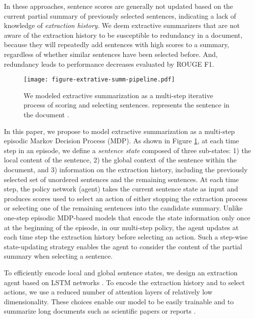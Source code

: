 \documentclass[11pt]{article}
\begin{document}
In these approaches, sentence scores are generally not updated based on the current partial summary of previously selected sentences, indicating a lack of knowledge of \textit{extraction history}. We deem extractive summarizers that are not aware of the extraction history to be susceptible to redundancy in a document, because they will repeatedly add sentences with high scores to a summary, regardless of whether similar sentences have been selected before. And, redundancy leads to performance decreases evaluated by ROUGE F1.

\begin{figure}
\centering
  \texttt{[image: figure-extrative-summ-pipeline.pdf]}
  \caption{We modeled extractive summarization as a multi-step iterative process of scoring and selecting sentences.  represents the  sentence in the document .}
  \label{fig:extractive_summ_pipeline}
\end{figure}


In this paper, we propose to model extractive summarization as a multi-step episodic Markov Decision Process (MDP). As shown in Figure \ref{fig:extractive_summ_pipeline}, at each time step in an episode, we define a \textit{sentence state} composed of three sub-states: 1) the local content of the sentence, 2) the global context of the sentence within the document, and 3) information on the extraction history, including the previously selected set of unordered sentences and the remaining sentences. At each time step, the policy network (agent) takes the current sentence state as input and produces scores used to select an action of either stopping the extraction process or selecting one of the remaining sentences into the candidate summary. Unlike one-step episodic MDP-based models \cite{narayan2018ranking,dong2018banditsum, luo2019reading} that encode the state information only once at the beginning of the episode, in our multi-step policy, the agent updates at each time step the extraction history before selecting an action. Such a step-wise state-updating strategy enables the agent to consider the content of the partial summary when selecting a sentence. 

To efficiently encode local and global sentence states, we design an extraction agent based on LSTM networks \cite{hochreiter1997long}. To encode the extraction history and to select actions, we use a reduced number of attention layers \cite{vaswani2017attention} of relatively low dimensionality. These choices enable our model to be easily trainable and to summarize long documents such as scientific papers \cite{cohan2018discourse,huang2021efficient} or reports \cite{huang2021efficient}.
\end{document}
